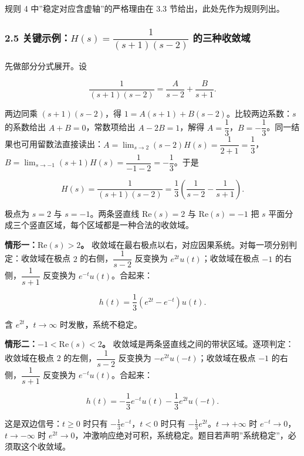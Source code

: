 \documentclass[12pt]{ctexart}
\begin{document}
规则 4 中''稳定对应含虚轴''的严格理由在 3.3 节给出，此处先作为规则列出。

\hypertarget{ux5173ux952eux793aux4f8bhsdfrac1s1s-2-ux7684ux4e09ux79cdux6536ux655bux57df}{%
\subsubsection{\texorpdfstring{2.5
关键示例：\(H(s)=\dfrac{1}{(s+1)(s-2)}\)
的三种收敛域}{2.5 关键示例：H(s)=\textbackslash dfrac\{1\}\{(s+1)(s-2)\} 的三种收敛域}}\label{ux5173ux952eux793aux4f8bhsdfrac1s1s-2-ux7684ux4e09ux79cdux6536ux655bux57df}}

先做部分分式展开。设

\[
\frac{1}{(s+1)(s-2)}=\frac{A}{s-2}+\frac{B}{s+1}.
\]

两边同乘 \((s+1)(s-2)\)，得 \(1=A(s+1)+B(s-2)\)。比较两边系数：\(s\)
的系数给出 \(A+B=0\)，常数项给出 \(A-2B=1\)，解得
\(A=\dfrac{1}{3}\)，\(B=-\dfrac{1}{3}\)。同一结果也可用留数法直接读出：\(A=\lim_{s\to 2}(s-2)H(s)=\dfrac{1}{2+1}=\dfrac{1}{3}\)，\(B=\lim_{s\to -1}(s+1)H(s)=\dfrac{1}{-1-2}=-\dfrac{1}{3}\)。于是

\[
H(s)=\frac{1}{(s+1)(s-2)}=\frac{1}{3}\left(\frac{1}{s-2}-\frac{1}{s+1}\right).
\]

极点为 \(s=2\) 与 \(s=-1\)。两条竖直线 \(\mathrm{Re}(s)=2\) 与
\(\mathrm{Re}(s)=-1\) 把 \(s\)
平面分成三个竖直区域，每个区域都是一种合法的收敛域。

\textbf{情形一：\(\mathrm{Re}(s)>2\)。}
收敛域在最右极点以右，对应因果系统。对每一项分别判定：收敛域在极点 \(2\)
的右侧，\(\dfrac{1}{s-2}\) 反变换为 \(e^{2t}u(t)\)；收敛域在极点 \(-1\)
的右侧，\(\dfrac{1}{s+1}\) 反变换为 \(e^{-t}u(t)\)。合起来：

\[
h(t)=\frac{1}{3}\left(e^{2t}-e^{-t}\right)u(t).
\]

含 \(e^{2t}\)，\(t\to\infty\) 时发散，系统不稳定。

\textbf{情形二：\(-1<\mathrm{Re}(s)<2\)。}
收敛域是两条竖直线之间的带状区域。逐项判定：收敛域在极点 \(2\)
的左侧，\(\dfrac{1}{s-2}\) 反变换为 \(-e^{2t}u(-t)\)；收敛域在极点
\(-1\) 的右侧，\(\dfrac{1}{s+1}\) 反变换为 \(e^{-t}u(t)\)。合起来：

\[
h(t)=-\frac{1}{3}e^{-t}u(t)-\frac{1}{3}e^{2t}u(-t).
\]

这是双边信号：\(t\ge 0\) 时只有 \(-\frac{1}{3}e^{-t}\)，\(t<0\) 时只有
\(-\frac{1}{3}e^{2t}\)。\(t\to+\infty\) 时
\(e^{-t}\to 0\)，\(t\to-\infty\) 时
\(e^{2t}\to 0\)，冲激响应绝对可积，系统稳定。题目若声明''系统稳定''，必须取这个收敛域。
\end{document}
